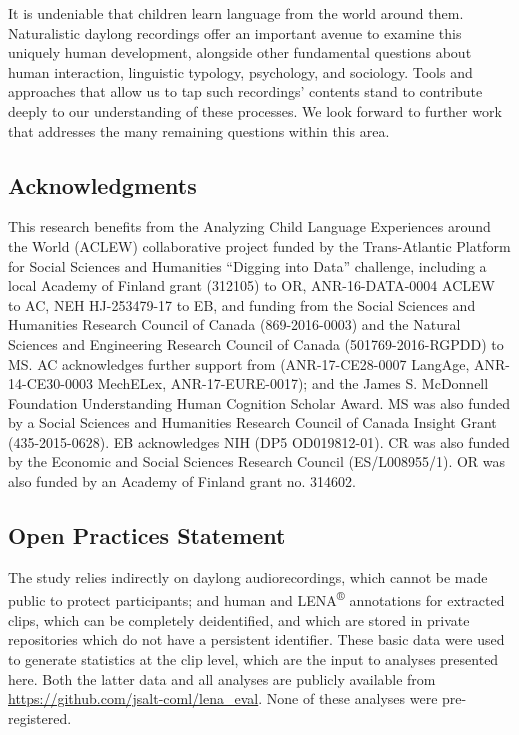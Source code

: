 \documentclass[english,table,man,floatsintext]{apa6}
\begin{document}
It is undeniable that children learn language from the world around
them. Naturalistic daylong recordings offer an important avenue to
examine this uniquely human development, alongside other fundamental
questions about human interaction, linguistic typology, psychology, and
sociology. Tools and approaches that allow us to tap such recordings'
contents stand to contribute deeply to our understanding of these
processes. We look forward to further work that addresses the many
remaining questions within this area.

\subsection{Acknowledgments}\label{acknowledgments}

This research benefits from the Analyzing Child Language Experiences
around the World (ACLEW) collaborative project funded by the
Trans-Atlantic Platform for Social Sciences and Humanities
\enquote{Digging into Data} challenge, including a local Academy of
Finland grant (312105) to OR, ANR-16-DATA-0004 ACLEW to AC, NEH
HJ-253479-17 to EB, and funding from the Social Sciences and Humanities
Research Council of Canada (869-2016-0003) and the Natural Sciences and
Engineering Research Council of Canada (501769-2016-RGPDD) to MS. AC
acknowledges further support from (ANR-17-CE28-0007 LangAge,
ANR-14-CE30-0003 MechELex, ANR-17-EURE-0017); and the James S. McDonnell
Foundation Understanding Human Cognition Scholar Award. MS was also
funded by a Social Sciences and Humanities Research Council of Canada
Insight Grant (435-2015-0628). EB acknowledges NIH (DP5 OD019812-01). CR
was also funded by the Economic and Social Sciences Research Council
(ES/L008955/1). OR was also funded by an Academy of Finland grant no.
314602.

\subsection{Open Practices Statement}\label{open-practices-statement}

The study relies indirectly on daylong audiorecordings, which cannot be
made public to protect participants; and human and
LENA\textsuperscript{®} annotations for extracted clips, which can be
completely deidentified, and which are stored in private repositories
which do not have a persistent identifier. These basic data were used to
generate statistics at the clip level, which are the input to analyses
presented here. Both the latter data and all analyses are publicly
available from \url{https://github.com/jsalt-coml/lena_eval}. None of
these analyses were pre-registered.
\end{document}
